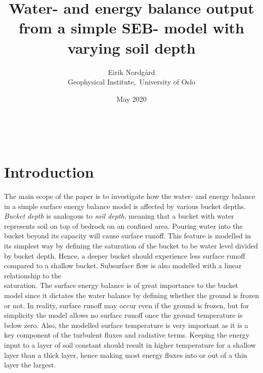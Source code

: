 \documentclass[a4paper,11pt,twocolumn]{article}
\begin{document}
\title{Water- and energy balance output from a simple SEB- model with varying soil depth}
\date{May 2020}
\author{Eirik Nordgård\\ Geophysical Institute,\ University of Oslo}


\
\section{Introduction}

The main scope of the paper is to investigate how the water- and energy balance in a simple surface energy balance model is affected by various bucket depths. \textit{Bucket depth} is analogous to \textit{soil depth}, meaning that a bucket with water represents soil on top of bedrock on an confined area. Pouring water into the bucket beyond its capacity will cause surface runoff. This feature is modelled in its simplest way by defining the saturation of the bucket to be water level divided by bucket depth. Hence, a deeper bucket should experience less surface runoff compared to a shallow bucket. Subsurface flow is also modelled with a linear relationship to the 
\\
saturation. The surface energy balance 
is of great importance to the bucket model since it dictates the water balance by defining whether the ground is frozen or not. In reality, surface runoff may occur even if the ground is frozen, but for simplicity the model allows no surface runoff once the ground temperature is below zero. Also, the modelled surface temperature is very important as it is a key component of the turbulent fluxes and radiative terms. Keeping the energy input to a layer of soil constant should result in higher temperature for a shallow layer than a thick layer, hence making most energy fluxes into or out of a thin layer the largest. 
\end{document}

